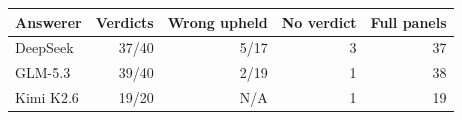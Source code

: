 \begin{tabular}{lrrrr}
\toprule
Answerer & Verdicts & Wrong upheld & No verdict & Full panels\\
\midrule
DeepSeek & 37/40 & 5/17 & 3 & 37\\
GLM-5.3 & 39/40 & 2/19 & 1 & 38\\
Kimi K2.6 & 19/20 & N/A & 1 & 19\\
\bottomrule
\end{tabular}

